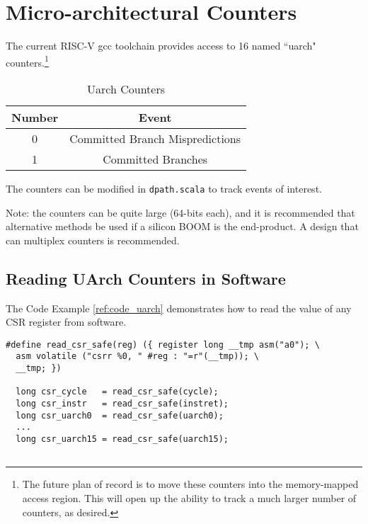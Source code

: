 \chapter{Micro-architectural Counters}

The current RISC-V gcc toolchain provides access to 16 named ``uarch" counters.\footnote{The future plan of record is to move these counters into the memory-mapped access region. This will open up the ability to track a much larger number of counters, as desired.}

\begin{table}[htdp]
\caption{Uarch Counters}
\begin{center}
\begin{tabular}{|c|c|}
\hline
Number & Event \\
\hline
\hline
0 & Committed Branch Mispredictions \\
\hline
1 & Committed Branches \\
\hline
\end{tabular}
\end{center}
\label{table:uarchcounters}
\end{table}%

The counters can be modified in {\tt dpath.scala} to track events of interest.

Note: the counters can be quite large (64-bits each), and it is recommended that alternative methods be used if a silicon BOOM is the end-product. A design that can multiplex counters is recommended. 

\section{Reading UArch Counters in Software}

The Code Example \ref{ref:code_uarch} demonstrates how to read the value of any CSR register from software.
  
  
\begin{center}
\begin{minipage}{0.66\textwidth}
\begin{lstlisting}[caption=Reading a CSR register]
#define read_csr_safe(reg) ({ register long __tmp asm("a0"); \   
  asm volatile ("csrr %0, " #reg : "=r"(__tmp)); \               
  __tmp; })             
  
  long csr_cycle   = read_csr_safe(cycle);
  long csr_instr   = read_csr_safe(instret);
  long csr_uarch0  = read_csr_safe(uarch0);
  ...
  long csr_uarch15 = read_csr_safe(uarch15);
  
\end{lstlisting}\label{ref:code_uarch}
\end{minipage}
\end{center}


